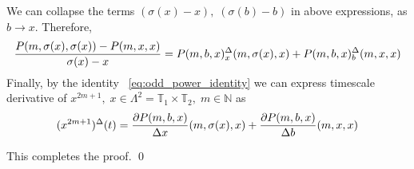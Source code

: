 We can collapse the terms $(\sigma(x) - x), \; (\sigma(b) - b)$ in above expressions, as $b\to x$.
Therefore,
\begin{align*}
    \frac{P ( m, \sigma(x), \sigma(x) ) - P ( m, x, x )}{\sigma(x) - x}
    = P ( m, b, x )^{\Delta}_{x} (m, \sigma(x), x)
    + P ( m, b, x )^{\Delta}_{b} (m, x, x)
\end{align*}
Finally, by the identity ~\eqref{eq:odd_power_identity} we can express
timescale derivative of $x^{2m+1}, \; x\in \Lambda^2 = \mathbb{T}_1 \times \mathbb{T}_2, \; m\in\mathbb{N}$
as
\begin{equation*}
(x^{2m+1})
    ^{\Delta}(t)= \frac{\partial P ( m, b, x )}{\Delta x} (m, \sigma(x), x)
    + \frac{\partial P ( m, b, x )}{\Delta b} (m, x, x)
\end{equation*}

This completes the proof. \qed
